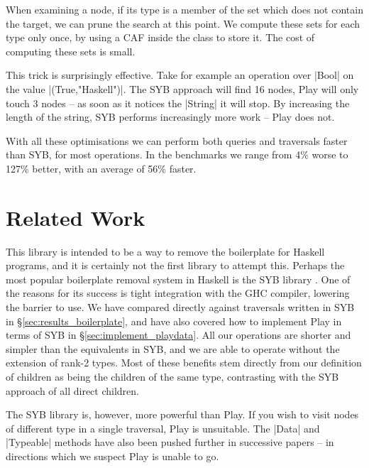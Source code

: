 \documentclass[preprint]{sigplanconf}
\begin{document}
When examining a node, if its type is a member of the set which does not contain the target, we can prune the search at this point. We compute these sets for each type only once, by using a CAF inside the class to store it. The cost of computing these sets is small.

This trick is surprisingly effective. Take for example an operation over |Bool| on the value |(True,"Haskell")|. The SYB approach will find 16 nodes, Play will only touch 3 nodes -- as soon as it notices the |String| it will stop. By increasing the length of the string, SYB performs increasingly more work -- Play does not.

With all these optimisations we can perform both queries and traversals faster than SYB, for most operations. In the benchmarks we range from 4\% worse to 127\% better, with an average of 56\% faster.


\section{Related Work}
\label{sec:related}

This library is intended to be a way to remove the boilerplate for Haskell programs, and it is certainly not the first library to attempt this. Perhaps the most popular boilerplate removal system in Haskell is the SYB library \cite{lammel:syb}. One of the reasons for its success is tight integration with the GHC compiler, lowering the barrier to use. We have compared directly against traversals written in SYB in \S\ref{sec:results_boilerplate}, and have also covered how to implement Play in terms of SYB in \S\ref{sec:implement_playdata}. All our operations are shorter and simpler than the equivalents in SYB, and we are able to operate without the extension of rank-2 types. Most of these benefits stem directly from our definition of children as being the children of the same type, contrasting with the SYB approach of all direct children.

The SYB library is, however, more powerful than Play. If you wish to visit nodes of different type in a single traversal, Play is unsuitable. The |Data| and |Typeable| methods have also been pushed further in successive papers \cite{lammel:syb2,lammel:syb3} -- in directions which we suspect Play is unable to go.
\end{document}
